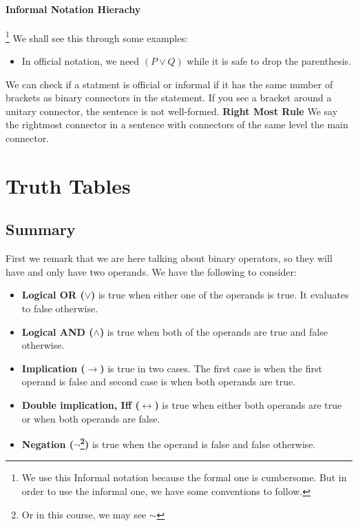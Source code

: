 \documentclass[10pt]{article}
\renewcommand{\iff}{\leftrightarrow}
\renewcommand{\implies}{\rightarrow}
\begin{document}
\paragraph{Informal Notation Hierachy}\footnote{We use this Informal notation because the formal one is cumbersome. But in order to use the informal one, we have some conventions to follow.} 
We shall see this through some examples:
\begin{itemize}
    \item In official notation, we need $(P\vee Q)$ while it is safe to drop the parenthesis.
\end{itemize}
We can check if a statment is official or informal if it has the same number of brackets as binary connectors in the statement. If you see a bracket around a unitary connector, the sentence is not well-formed.
\textbf{Right Most Rule} We say the rightmost connector in a sentence with connectors of the same level the main connector.



\section{Truth Tables}
\subsection{Summary} First we remark that we are here talking about binary operators, 
so they will have and only have two operands. We have the following to consider:
\begin{itemize}
    \item \textbf{Logical OR ($\vee$)} is true when either one of the operands is true. 
        It evaluates to false otherwise.
    \item \textbf{Logical AND ($\land$)} is true when both of the operands are true and false otherwise.
    \item \textbf{Implication ($\implies$)} is true in two cases. The first case is when the
        first operand is false and second case is when both operands are true.
    \item \textbf{Double implication, Iff ($\iff$)} is true when either both operands are true 
        or when both operands are false.
    \item \textbf{Negation ($\neg$\footnote{Or in this course, we may see $\sim$})} is true when the operand
        is false and false otherwise.
\end{itemize}
\end{document}
